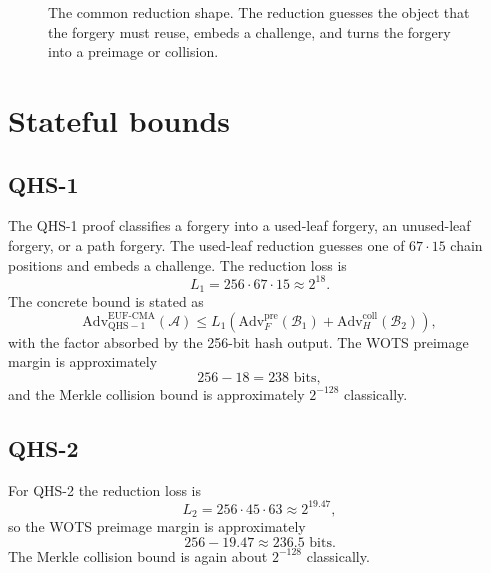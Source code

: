 \documentclass[11pt,a4paper]{article}
\theoremstyle{remark}
\newcommand{\Adv}{\mathrm{Adv}}
\newcommand{\EUF}{\mathrm{EUF\text{-}CMA}}
\newcommand{\pre}{\mathrm{pre}}
\newcommand{\coll}{\mathrm{coll}}
\begin{document}
\begin{figure}[ht]
\centering
{}
\caption{The common reduction shape. The reduction guesses the object that the
forgery must reuse, embeds a challenge, and turns the forgery into a preimage or
collision.}
\label{fig:reduction}
\end{figure}

\section{Stateful bounds}

\subsection{QHS-1}

The QHS-1 proof classifies a forgery into a used-leaf forgery, an unused-leaf
forgery, or a path forgery. The used-leaf reduction guesses one of \(67\cdot15\)
chain positions and embeds a challenge. The reduction loss is
\[
L_1=256\cdot67\cdot15\approx 2^{18}.
\]
The concrete bound is stated as
\[
\Adv^{\EUF}_{\mathrm{QHS-1}}(\mathcal{A})
\le
L_1\left(\Adv^{\pre}_{F}(\mathcal{B}_1)
+\Adv^{\coll}_{H}(\mathcal{B}_2)\right),
\]
with the factor absorbed by the 256-bit hash output. The WOTS preimage margin is
approximately
\[
256-18=238\text{ bits},
\]
and the Merkle collision bound is approximately \(2^{-128}\) classically.

\subsection{QHS-2}

For QHS-2 the reduction loss is
\[
L_2=256\cdot45\cdot63\approx 2^{19.47},
\]
so the WOTS preimage margin is approximately
\[
256-19.47\approx 236.5\text{ bits}.
\]
The Merkle collision bound is again about \(2^{-128}\) classically.
\end{document}
